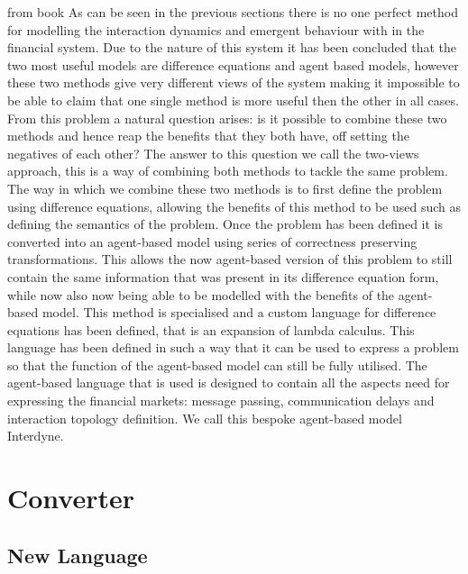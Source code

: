 \documentclass{article}
\begin{document}
from book
As can be seen in the previous sections there is no one perfect method for modelling the interaction dynamics and emergent behaviour with in the financial system. Due to the nature of this system it has been concluded that the two most useful models are difference equations and agent based models, however these two methods give very different views of the system making it impossible to be able to claim that one single method is more useful then the other in all cases. From this problem a natural question arises: is it possible to combine these two methods and hence reap the benefits that they both have, off setting the negatives of each other? The answer to this question we call the two-views approach, this is a way of combining both methods to tackle the same problem. The way in which we combine these two methods is to first define the problem using difference equations, allowing the benefits of this method to be used such as defining the semantics of the problem. Once the problem has been defined it is converted into an agent-based model using series of correctness preserving transformations. This allows the now agent-based version of this problem to still contain the same information that was present in its difference equation form, while now also now being able to be modelled with the benefits of the agent-based model.      
This method is specialised and a custom language for difference equations has been defined, that is an expansion of lambda calculus. This language has been defined in such a way that it can be used to express a problem so that the function of the agent-based model can still be fully utilised. The agent-based language that is used is designed to contain all the aspects need for expressing the financial markets: message passing, communication delays and interaction topology definition. We call this bespoke agent-based model Interdyne. 

\section{Converter} 


\subsection{New Language}
\end{document}
